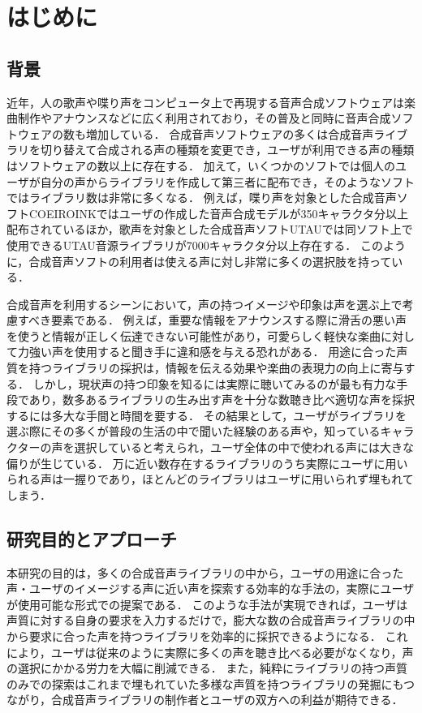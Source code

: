 \chapter{はじめに}
\thispagestyle{myheadings}

\section{背景}
\label{sec:background}

近年，人の歌声や喋り声をコンピュータ上で再現する音声合成ソフトウェアは楽曲制作やアナウンスなどに広く利用されており，その普及と同時に音声合成ソフトウェアの数も増加している．
合成音声ソフトウェアの多くは合成音声ライブラリを切り替えて合成される声の種類を変更でき，ユーザが利用できる声の種類はソフトウェアの数以上に存在する．
加えて，いくつかのソフトでは個人のユーザが自分の声からライブラリを作成して第三者に配布でき，そのようなソフトではライブラリ数は非常に多くなる．
例えば，喋り声を対象とした合成音声ソフトCOEIROINKではユーザの作成した音声合成モデルが350キャラクタ分以上配布されているほか\cite{mycoeiroink}，歌声を対象とした合成音声ソフトUTAUでは同ソフト上で使用できるUTAU音源ライブラリが7000キャラクタ分以上存在する\cite{vdbutau}．
このように，合成音声ソフトの利用者は使える声に対し非常に多くの選択肢を持っている．

合成音声を利用するシーンにおいて，声の持つイメージや印象は声を選ぶ上で考慮すべき要素である．
例えば，重要な情報をアナウンスする際に滑舌の悪い声を使うと情報が正しく伝達できない可能性があり，可愛らしく軽快な楽曲に対して力強い声を使用すると聞き手に違和感を与える恐れがある．
用途に合った声質を持つライブラリの採択は，情報を伝える効果や楽曲の表現力の向上に寄与する．
しかし，現状声の持つ印象を知るには実際に聴いてみるのが最も有力な手段であり，数多あるライブラリの生み出す声を十分な数聴き比べ適切な声を採択するには多大な手間と時間を要する．
その結果として，ユーザがライブラリを選ぶ際にその多くが普段の生活の中で聞いた経験のある声や，知っているキャラクターの声を選択していると考えられ，ユーザ全体の中で使われる声には大きな偏りが生じている．
万に近い数存在するライブラリのうち実際にユーザに用いられる声は一握りであり，ほとんどのライブラリはユーザに用いられず埋もれてしまう．

\section{研究目的とアプローチ}
本研究の目的は，多くの合成音声ライブラリの中から，ユーザの用途に合った声・ユーザのイメージする声に近い声を探索する効率的な手法の，実際にユーザが使用可能な形式での提案である．
このような手法が実現できれば，ユーザは声質に対する自身の要求を入力するだけで，膨大な数の合成音声ライブラリの中から要求に合った声を持つライブラリを効率的に採択できるようになる．
これにより，ユーザは従来のように実際に多くの声を聴き比べる必要がなくなり，声の選択にかかる労力を大幅に削減できる．
また，純粋にライブラリの持つ声質のみでの探索はこれまで埋もれていた多様な声質を持つライブラリの発掘にもつながり，合成音声ライブラリの制作者とユーザの双方への利益が期待できる．

